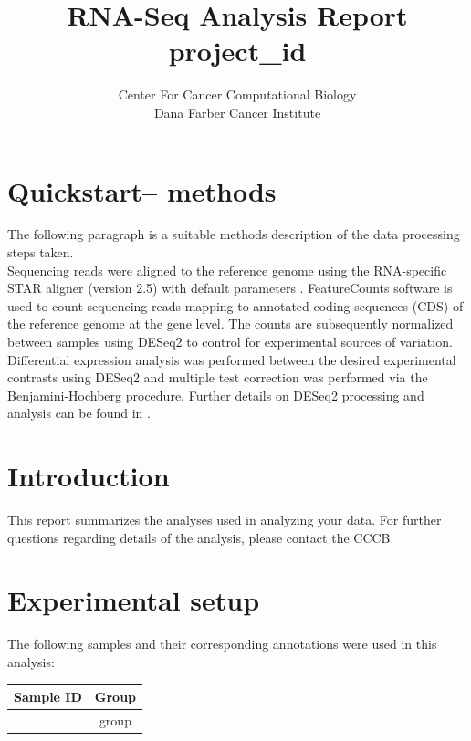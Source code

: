 \documentclass{article}
\title{RNA-Seq Analysis Report \\ {{project_id}}}
\author{Center For Cancer Computational Biology \\ Dana Farber Cancer Institute}
\begin{document}
\maketitle

\section{Quickstart-- methods}
The following paragraph is a suitable methods description of the data processing steps taken.\\

Sequencing reads were aligned to the reference genome using the RNA-specific STAR aligner (version 2.5) with default parameters \cite{star}.
FeatureCounts software \cite{featureCounts} is used to count sequencing reads mapping to annotated coding sequences (CDS) of the reference genome at the gene level.
The counts are subsequently normalized between samples using DESeq2 \cite{deseq2}  to control for experimental sources of variation.
Differential expression analysis was performed between the desired experimental contrasts using DESeq2 and multiple test correction was performed via the Benjamini-Hochberg procedure.
Further details on DESeq2 processing and analysis can be found in \cite{deseq2}. 

\section{Introduction}
This report summarizes the analyses used in analyzing your data. For further questions regarding details of the analysis, please contact the CCCB.

\section{Experimental setup}

The following samples and their corresponding annotations were used in this analysis:

\begin{center}
    \begin{tabular}{c|c}
     Sample ID & Group \\ \hline
     {%
	{{id}} & {{group}}{%
     {%
    \end{tabular}
\end{center}
\end{document}
